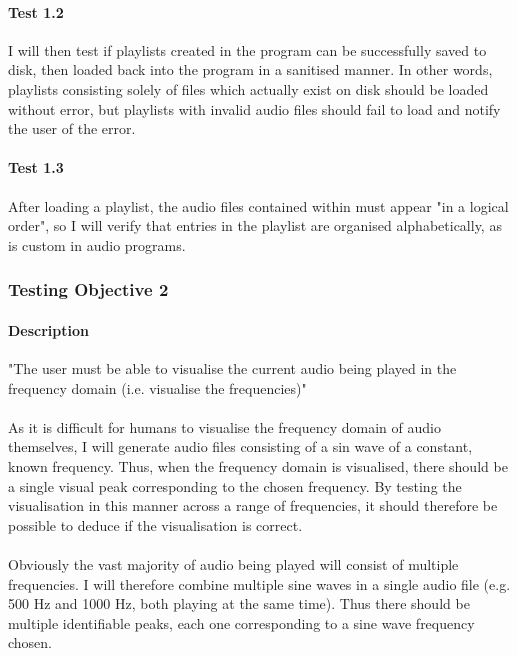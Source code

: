 \paragraph{Test 1.2}
I will then test if playlists created in the program can be successfully saved to disk, then loaded back into the program in a sanitised manner. In other words, playlists consisting solely of files which actually exist on disk should be loaded without error, but playlists with invalid audio files should fail to load and notify the user of the error.

\paragraph{Test 1.3}
After loading a playlist, the audio files contained within must appear "in a logical order", so I will verify that entries in the playlist are organised alphabetically, as is custom in audio programs.

\subsubsection{Testing Objective 2}
\paragraph{Description} "The user must be able to visualise the current audio being played in the frequency domain (i.e. visualise the frequencies)"

\paragraph{}
As it is difficult for humans to visualise the frequency domain of audio themselves, I will generate audio files consisting of a sin wave of a constant, known frequency. Thus, when the frequency domain is visualised, there should be a single visual peak corresponding to the chosen frequency. By testing the visualisation in this manner across a range of frequencies, it should therefore be possible to deduce if the visualisation is correct.

\paragraph{}
Obviously the vast majority of audio being played will consist of multiple frequencies. I will therefore combine multiple sine waves in a single audio file (e.g. 500 Hz and 1000 Hz, both playing at the same time). Thus there should be multiple identifiable peaks, each one corresponding to a sine wave frequency chosen.

